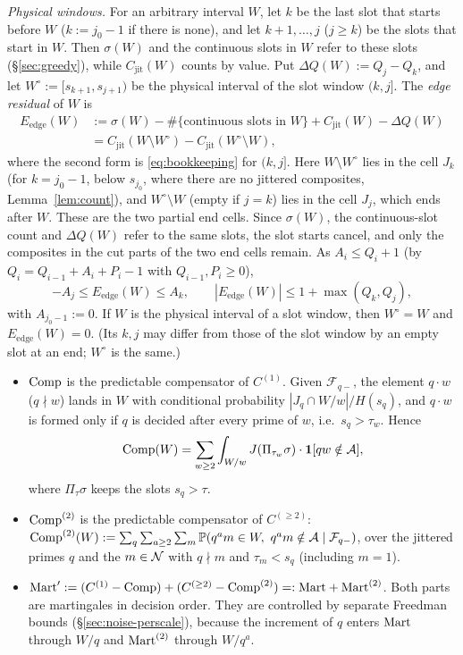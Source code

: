 \emph{Physical windows.} For an arbitrary interval $W$, let $k$ be the last slot that starts before $W$ ($k:=j_0-1$ if there
is none), and let $k+1,\dots,j$ ($j\ge k$) be the slots that start in $W$. Then $\sigma(W)$ and the continuous slots in $W$
refer to these slots (\S\ref{sec:greedy}), while $C_{\mathrm{jit}}(W)$ counts by value. Put $\Delta Q(W):=Q_j-Q_k$, and let
$W^\circ:=[s_{k+1},s_{j+1})$ be the physical interval of the slot window $(k,j]$. The \emph{edge residual} of $W$ is
\begin{equation}\label{eq:edge}
\begin{aligned}
  E_{\mathrm{edge}}(W)&:=\sigma(W)-\#\{\text{continuous slots in }W\}+C_{\mathrm{jit}}(W)-\Delta Q(W)\\
  &=C_{\mathrm{jit}}(W\setminus W^\circ)-C_{\mathrm{jit}}(W^\circ\setminus W),
\end{aligned}
\end{equation}
where the second form is \eqref{eq:bookkeeping} for $(k,j]$. Here $W\setminus W^\circ$ lies in the cell $J_k$ (for $k=j_0-1$,
below $s_{j_0}$, where there are no jittered composites, Lemma~\ref{lem:count}), and $W^\circ\setminus W$ (empty if $j=k$) lies
in the cell $J_j$, which ends after $W$. These are the two partial end cells. Since $\sigma(W)$, the continuous-slot count and
$\Delta Q(W)$ refer to the same slots, the slot starts cancel, and only the composites in the cut parts of the two end cells
remain. As $A_i\le Q_i+1$ (by $Q_i=Q_{i-1}+A_i+P_i-1$ with $Q_{i-1},P_i\ge0$),
\[
  -A_j\le E_{\mathrm{edge}}(W)\le A_k,\qquad|E_{\mathrm{edge}}(W)|\le1+\max(Q_k,Q_j),
\]
with $A_{j_0-1}:=0$. If $W$ is the physical interval of a slot window, then $W^\circ=W$ and $E_{\mathrm{edge}}(W)=0$. (Its $k,j$ may differ from those of the slot window by an empty slot at an end; $W^\circ$ is the same.)
\begin{itemize}
\item $\mathrm{Comp}$ is the predictable compensator of $C^{(1)}$. Given $\mathcal F_{q-}$, the element $q\cdot w$ ($q\nmid w$)
  lands in $W$ with conditional probability $|J_q\cap W/w|/H(s_q)$, and $q\cdot w$ is formed only if $q$ is decided
  after every prime of $w$, i.e.\ $s_q>\tau_w$. Hence
  \[
    \mathrm{Comp}(W)=\sum_{w\ge2}\int_{W/w}J(\Pi_{\tau_w}\sigma)\cdot\mathbf 1[qw\notin\mathcal{A}],
  \]
  where $\Pi_\tau\sigma$ keeps the slots $s_q>\tau$.
\item $\mathrm{Comp}^{(2)}$ is the predictable compensator of $C^{(\ge2)}$:
  $\mathrm{Comp}^{(2)}(W):=\sum_q\sum_{a\ge2}\sum_m\mathbb{P}(q^am\in W,\ q^am\notin\mathcal{A}\mid\mathcal F_{q-})$, over the jittered primes $q$
  and the $m\in\mathcal{N}$ with $q\nmid m$ and $\tau_m<s_q$ (including $m=1$).
\item $\mathrm{Mart}':=(C^{(1)}-\mathrm{Comp})+(C^{(\ge2)}-\mathrm{Comp}^{(2)})=:\mathrm{Mart}+\mathrm{Mart}^{(2)}$. Both parts are martingales in decision
  order. They are controlled by separate Freedman bounds (\S\ref{sec:noise-perscale}), because the increment of $q$ enters
  $\mathrm{Mart}$ through $W/q$ and $\mathrm{Mart}^{(2)}$ through $W/q^a$.
\end{itemize}

